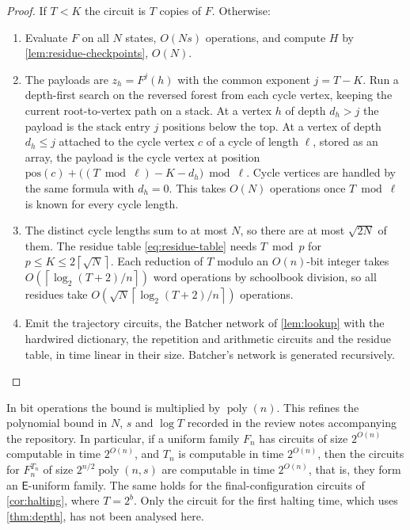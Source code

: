 \documentclass[11pt]{article}
\theoremstyle{definition}
\theoremstyle{remark}
\newcommand{\poly}{\operatorname{poly}}
\newcommand{\ceil}[1]{\left\lceil #1\right\rceil}
\numberwithin{equation}{section}
\begin{document}
\begin{proof}
If $T<K$ the circuit is $T$ copies of $F$.  Otherwise:
\begin{enumerate}
\item Evaluate $F$ on all $N$ states, $O(Ns)$ operations, and compute $H$ by
  \cref{lem:residue-checkpoints}, $O(N)$.
\item The payloads are $z_h=F^j(h)$ with the common exponent $j=T-K$.  Run a
  depth-first search on the reversed forest from each cycle vertex,
  keeping the current root-to-vertex path on a stack.  At a vertex $h$ of
  depth $d_h>j$ the payload is the stack entry $j$ positions below the
  top.  At a vertex of depth $d_h\leq j$ attached to the cycle vertex $c$
  of a cycle of length $\ell$, stored as an array, the payload is the cycle
  vertex at position
  $\mathrm{pos}(c)+\bigl((T\bmod\ell)-K-d_h\bigr)\bmod\ell$.  Cycle
  vertices are handled by the same formula with $d_h=0$.  This takes
  $O(N)$ operations once $T\bmod\ell$ is known for every cycle length.
\item The distinct cycle lengths sum to at most $N$, so there are at most
  $\sqrt{2N}$ of them.  The residue table \cref{eq:residue-table} needs
  $T\bmod p$ for $p\leq K\leq2\ceil{\sqrt N}$.  Each reduction of $T$
  modulo an $O(n)$-bit integer takes $O(\ceil{\log_2(T+2)/n})$ word
  operations by schoolbook division, so all residues take
  $O(\sqrt N\ceil{\log_2(T+2)/n})$ operations.
\item Emit the trajectory circuits, the Batcher network of
  \cref{lem:lookup} with the hardwired dictionary, the repetition and
  arithmetic circuits and the residue table, in time linear in their
  size.  Batcher's network is generated recursively.\qedhere
\end{enumerate}
\end{proof}

In bit operations the bound is multiplied by $\poly(n)$.  This refines the
polynomial bound in $N$, $s$ and $\log T$ recorded in the review notes
accompanying the repository.  In particular, if a uniform family $F_n$ has
circuits of size $2^{O(n)}$ computable in time $2^{O(n)}$, and $T_n$ is
computable in time $2^{O(n)}$, then the circuits for $F_n^{T_n}$ of size
$2^{n/2}\poly(n,s)$ are computable in time $2^{O(n)}$, that is, they form an
$\mathsf{E}$-uniform family.  The same holds for the final-configuration
circuits of \cref{cor:halting}, where $T=2^b$.  Only the circuit for the
first halting time, which uses \cref{thm:depth}, has not been analysed
here.
\end{document}

